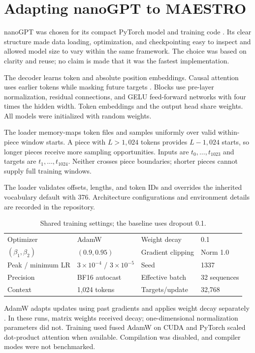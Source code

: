 \section{Adapting nanoGPT to MAESTRO}
\label{sec:implementation}
nanoGPT was chosen for its compact PyTorch model and training code \citep{karpathynanogpt}. Its clear structure made data loading, optimization, and checkpointing easy to inspect and allowed model size to vary within the same framework. The choice was based on clarity and reuse; no claim is made that it was the fastest implementation.

The decoder learns token and absolute position embeddings. Causal attention uses earlier tokens while masking future targets \citep{vaswani2017attention}. Blocks use pre-layer normalization, residual connections, and GELU feed-forward networks with four times the hidden width. Token embeddings and the output head share weights. All models were initialized with random weights.

The loader memory-maps token files and samples uniformly over valid within-piece window starts. A piece with $L>1{,}024$ tokens provides $L-1{,}024$ starts, so longer pieces receive more sampling opportunities. Inputs are $t_0,\ldots,t_{1023}$ and targets are $t_1,\ldots,t_{1024}$. Neither crosses piece boundaries; shorter pieces cannot supply full training windows.

The loader validates offsets, lengths, and token IDs and overrides the inherited vocabulary default with 376. Architecture configurations and environment details are recorded in the repository.

\begin{table}[H]
\centering
\caption{Shared training settings; the baseline uses dropout 0.1.}
\begin{tabular}{ll@{\qquad}ll}
\toprule Optimizer & AdamW & Weight decay & 0.1\\
$(\beta_1,\beta_2)$ & $(0.9,0.95)$ & Gradient clipping & Norm 1.0\\
Peak / minimum LR & $3\!\times\!10^{-4}$ / $3\!\times\!10^{-5}$ & Seed & 1337\\
Precision & BF16 autocast & Effective batch & 32 sequences\\
Context & 1,024 tokens & Targets/update & 32,768\\\bottomrule
\end{tabular}
\end{table}

AdamW adapts updates using past gradients and applies weight decay separately \citep{loshchilov2019adamw}. In these runs, matrix weights received decay; one-dimensional normalization parameters did not. Training used fused AdamW on CUDA and PyTorch scaled dot-product attention when available. Compilation was disabled, and compiler modes were not benchmarked.

